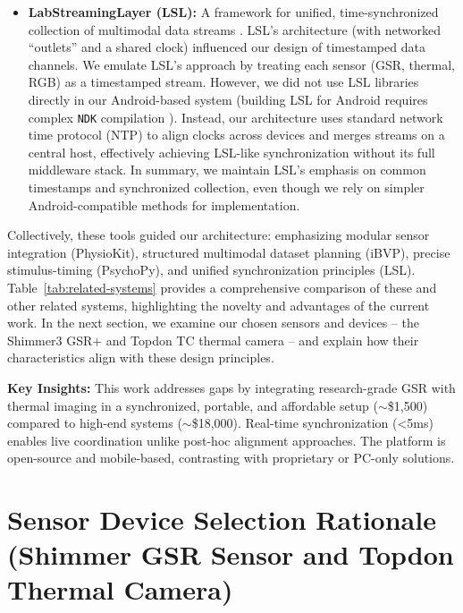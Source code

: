 \documentclass{report}
\begin{document}
\begin{itemize}
        \item \textbf{LabStreamingLayer (LSL):} A framework for unified, time-synchronized collection of multimodal data streams \cite{lsl}. LSL's architecture (with networked ``outlets'' and a shared clock) influenced our design of timestamped data channels. We emulate LSL's approach by treating each sensor (GSR, thermal, RGB) as a timestamped stream. However, we did not use LSL libraries directly in our Android-based system (building LSL for Android requires complex \texttt{NDK} compilation \cite{lsl}). Instead, our architecture uses standard network time protocol (NTP) to align clocks across devices and merges streams on a central host, effectively achieving LSL-like synchronization without its full middleware stack. In summary, we maintain LSL's emphasis on common timestamps and synchronized collection, even though we rely on simpler Android-compatible methods for implementation.
    \end{itemize}

    Collectively, these tools guided our architecture: emphasizing modular sensor integration (PhysioKit), structured multimodal dataset planning (iBVP), precise stimulus-timing (PsychoPy), and unified synchronization principles (LSL). Table~\ref{tab:related-systems} provides a comprehensive comparison of these and other related systems, highlighting the novelty and advantages of the current work. In the next section, we examine our chosen sensors and devices -- the Shimmer3 GSR+ and Topdon TC thermal camera -- and explain how their characteristics align with these design principles.

\begin{table}[htbp]
    \centering
    \small
    \caption{Related Systems and Methods Comparison}
    \label{tab:related-systems}
    
    \vspace{0.3cm}
    \textbf{Key Insights:} This work addresses gaps by integrating research-grade GSR with thermal imaging in a synchronized, portable, and affordable setup ($\sim$\$1,500) compared to high-end systems ($\sim$\$18,000). Real-time synchronization (<5ms) enables live coordination unlike post-hoc alignment approaches. The platform is open-source and mobile-based, contrasting with proprietary or PC-only solutions.
\end{table}

    \section{Sensor Device Selection Rationale (Shimmer GSR Sensor and Topdon Thermal Camera)}
    \label{sec:sensor_selection}
\end{document}
